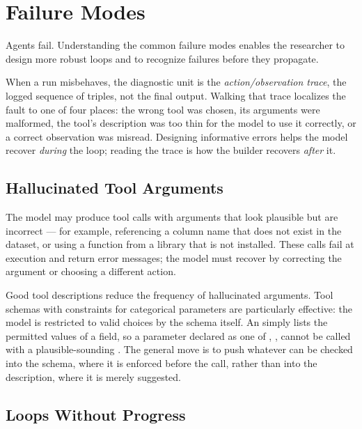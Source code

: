 \section{Failure Modes}
\label{section:FailureModes}

Agents fail.
Understanding the common failure modes enables the researcher to design more robust loops and to recognize failures before they propagate.

\begin{remark}
When a run misbehaves, the diagnostic unit is the \emph{action/observation trace}, the logged sequence of  triples, not the final output.
Walking that trace localizes the fault to one of four places: the wrong tool was chosen, its arguments were malformed, the tool's description was too thin for the model to use it correctly, or a correct observation was misread.
Designing informative errors helps the model recover \emph{during} the loop; reading the trace is how the builder recovers \emph{after} it.
\end{remark}

\subsection{Hallucinated Tool Arguments}

The model may produce tool calls with arguments that look plausible but are incorrect — for example, referencing a column name that does not exist in the dataset, or using a function from a library that is not installed.
These calls fail at execution and return error messages; the model must recover by correcting the argument or choosing a different action.

Good tool descriptions reduce the frequency of hallucinated arguments.
Tool schemas with  constraints for categorical parameters are particularly effective: the model is restricted to valid choices by the schema itself.
An  simply lists the permitted values of a field, so a  parameter declared as one of , ,  cannot be called with a plausible-sounding .
The general move is to push whatever can be checked into the schema, where it is enforced before the call, rather than into the description, where it is merely suggested.

\subsection{Loops Without Progress}

